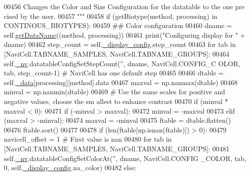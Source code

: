 \begin{DoxyCode}
00456 \textcolor{stringliteral}{        Changes the Color and Size Configuration for the datatable to the one pre
      cised by the user.}
00457 \textcolor{stringliteral}{        """}
00458         \textcolor{keywordflow}{if} (getBiotype(method, processing) \textcolor{keywordflow}{in} CONTINOUS\_BIOTYPES):
00459             \textcolor{comment}{## Color configuration}
00460             dname = self.\hyperlink{classnavicom_1_1navicom_1_1NaviCom_a51ecb41beebc7636bde73be2e1ffc407}{getDataName}((method, processing))
00461             \textcolor{keywordflow}{print}(\textcolor{stringliteral}{"Configuring display for "} + dname)
00462             step\_count = self.\hyperlink{classnavicom_1_1navicom_1_1NaviCom_ab8ddca454f674629472d8bfec46ac76f}{_display_config}.step\_count
00463             \textcolor{keywordflow}{for} tab \textcolor{keywordflow}{in} [NaviCell.TABNAME\_SAMPLES, NaviCell.TABNAME\_GROUPS]:
00464                 self.\hyperlink{classnavicom_1_1navicom_1_1NaviCom_afff3fd56fa16a68bab52ba8d801e325a}{_nv}.datatableConfigSetStepCount(\textcolor{stringliteral}{''}, dname, NaviCell.CONFIG\_C
      OLOR, tab, step\_count-1) \textcolor{comment}{# NaviCell has one default step}
00465 
00466             dtable = self.\hyperlink{classnavicom_1_1navicom_1_1NaviCom_a407b2b5c30a5652ee85c4be54b3e6679}{_data}[processing][method].data
00467             maxval = np.nanmax(dtable)
00468             minval = np.nanmin(dtable)
00469             \textcolor{comment}{# Use the same scales for positive and negative values, choose the sm
      allest to enhance contrast}
00470             \textcolor{keywordflow}{if} (minval * maxval < 0):
00471                 \textcolor{keywordflow}{if} (-minval > maxval):
00472                     minval = -maxval
00473                 \textcolor{keywordflow}{elif} (maxval > -minval):
00474                     maxval = -minval
00475             ftable = dtable.flatten()
00476             ftable.sort()
00477 
00478             \textcolor{keywordflow}{if} (len(ftable[np.isnan(ftable)]) > 0):
00479                 navicell\_offset = 1 \textcolor{comment}{# First value is nan}
00480                 \textcolor{keywordflow}{for} tab \textcolor{keywordflow}{in} [NaviCell.TABNAME\_SAMPLES, NaviCell.TABNAME\_GROUPS]:
00481                     self.\hyperlink{classnavicom_1_1navicom_1_1NaviCom_afff3fd56fa16a68bab52ba8d801e325a}{_nv}.datatableConfigSetColorAt(\textcolor{stringliteral}{''}, dname, NaviCell.CONFIG
      \_COLOR, tab, 0, self.\hyperlink{classnavicom_1_1navicom_1_1NaviCom_ab8ddca454f674629472d8bfec46ac76f}{_display_config}.na\_color)
00482             \textcolor{keywordflow}{else}:

\end{DoxyCode}
